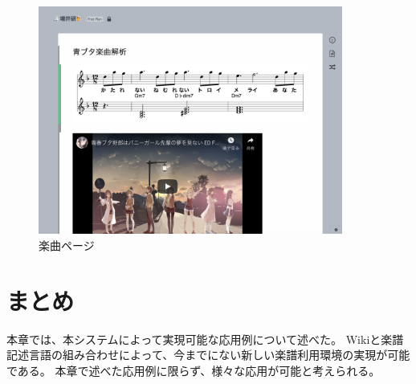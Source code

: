 \begin{figure}[H]
\centering
\includegraphics[width=10cm]{images/aobuta.png}
\caption{楽曲ページ}
\label{aobuta}
\end{figure}

\section{まとめ}
本章では、本システムによって実現可能な応用例について述べた。
Wikiと楽譜記述言語の組み合わせによって、今までにない新しい楽譜利用環境の実現が可能である。
本章で述べた応用例に限らず、様々な応用が可能と考えられる。